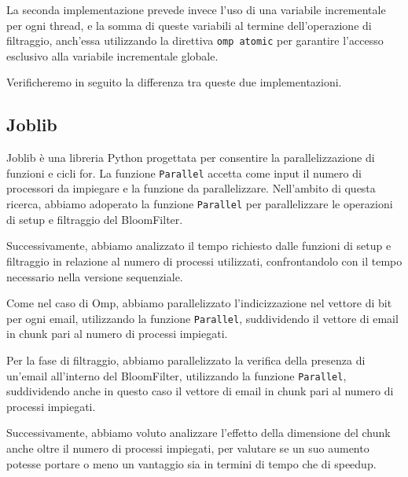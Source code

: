 
La seconda implementazione prevede invece l'uso di una variabile incrementale per ogni thread, e la somma di queste variabili
al termine dell'operazione di filtraggio, anch'essa utilizzando la direttiva \texttt{omp atomic} per garantire l'accesso esclusivo
alla variabile incrementale globale.

Verificheremo in seguito la differenza tra queste due implementazioni.

\subsection{Joblib}\label{subsec:joblib}
Joblib è una libreria Python progettata per consentire la parallelizzazione di funzioni e cicli for.
La funzione \texttt{Parallel} accetta come input il numero di processori da impiegare e la funzione da parallelizzare.
Nell'ambito di questa ricerca, abbiamo adoperato la funzione \texttt{Parallel} per parallelizzare le operazioni di setup
e filtraggio del BloomFilter.

Successivamente, abbiamo analizzato il tempo richiesto dalle funzioni di setup e filtraggio in relazione al numero
di processi utilizzati, confrontandolo con il tempo necessario nella versione sequenziale.

Come nel caso di Omp, abbiamo parallelizzato l'indicizzazione nel vettore di bit per ogni email, utilizzando la funzione \texttt{Parallel},
suddividendo il vettore di email in chunk pari al numero di processi impiegati.


Per la fase di filtraggio, abbiamo parallelizzato la verifica della presenza di un'email all'interno del BloomFilter, utilizzando la funzione \texttt{Parallel},
suddividendo anche in questo caso il vettore di email in chunk pari al numero di processi impiegati.

Successivamente, abbiamo voluto analizzare l'effetto della dimensione del chunk anche oltre il numero di processi impiegati,
per valutare se un suo aumento potesse portare o meno un vantaggio sia in termini di tempo che di speedup.